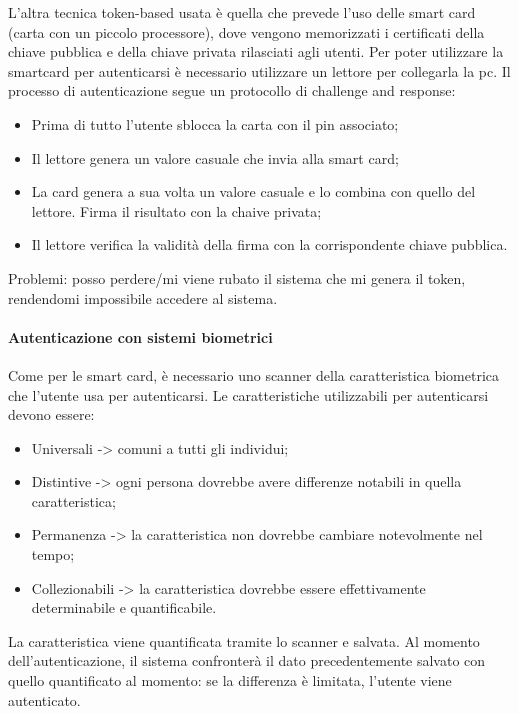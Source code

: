 L'altra tecnica token-based usata è quella che prevede l'uso delle smart card (carta con un piccolo processore), dove vengono memorizzati i certificati della chiave pubblica e della chiave privata rilasciati agli utenti. Per poter utilizzare la smartcard per autenticarsi è necessario utilizzare un lettore per collegarla la pc. Il processo di autenticazione segue un protocollo di challenge and response: 
\begin{itemize}
    \item Prima di tutto l'utente sblocca la carta con il pin associato;
    \item Il lettore genera un valore casuale che invia alla smart card;
    \item La card genera a sua volta un valore casuale e lo combina con quello del lettore. Firma il risultato con la chaive privata;
    \item Il lettore verifica la validità della firma con la corrispondente chiave pubblica.
\end{itemize}

\noindent Problemi: posso perdere/mi viene rubato il sistema che mi genera il token, rendendomi impossibile accedere al sistema. 

\paragraph{Autenticazione con sistemi biometrici} Come per le smart card, è necessario uno scanner della caratteristica biometrica che l'utente usa per autenticarsi. 
Le caratteristiche utilizzabili per autenticarsi devono essere:
\begin{itemize}
    \item Universali -> comuni a tutti gli individui;
    \item Distintive -> ogni persona dovrebbe avere differenze notabili in quella caratteristica;
    \item Permanenza -> la caratteristica non dovrebbe cambiare notevolmente nel tempo;
    \item Collezionabili -> la caratteristica dovrebbe essere effettivamente determinabile e quantificabile.
\end{itemize}

\noindent La caratteristica viene quantificata tramite lo scanner e salvata. Al momento dell'autenticazione, il sistema confronterà il dato precedentemente salvato con quello quantificato al momento: se la differenza è limitata, l'utente viene autenticato.


